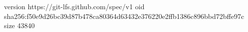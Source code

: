version https://git-lfs.github.com/spec/v1
oid sha256:f50e9d26bc39d87b478ca80364d63432e376220e2ffb1386c896bbd72bffe97c
size 43840
